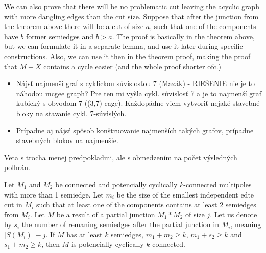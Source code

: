 \documentclass[12pt, twoside]{book}
\begin{document}
\todo{}We can also prove that there will be no problematic cut leaving the acyclic graph with more dangling edges than the cut size. Suppose that after the junction from the theorem above there will be a cut of size $a$, such that one of the components have $b$ former semiedges and $b>a$. The proof is basically in the theorem above, but we can formulate it in a separate lemma, and use it later during specific constructions. Also, we can use it then in the theorem proof, making the proof that $M-X$ contains a cycle easier (and the whole proof shorter ofc.)

\begin{itemize}
	\item Nájsť najmenší graf s cyklickou súvislosťou 7 (Mazák) - RIEŠENIE nie je to náhodou mcgee graph? Pre ten mi vyšla cykl. súvislosť 7 a je to najmenší graf kubický s obvodom 7 ((3,7)-cage). Každopádne viem vytvoriť nejaké stavebné bloky na stavanie cykl. 7-súvislých.
	\item Prípadne aj nájsť spôsob konštruovanie najmenších takých grafov, prípadne stavebných blokov na najmenšie.
\end{itemize}

Veta s trocha menej predpokladmi, ale s obmedzením na počet výsledných polhrán.
\begin{theorem}
	Let $M_1$ and $M_2$ be connected and potencially cyclically $k$-connected multipoles with more than 1 semiedge. Let $m_i$ be the size of the smallest independent edte cut in $M_i$ such that at least one of the components contains at least 2 semiedges from $M_i$. Let $M$ be a result of a partial junction $M_1*M_2$ of size $j$. Let us denote by $s_i$ the number of remaning semiedges after the partial junction in $M_i$, meaning $|S(M_i)|-j$. If $M$ has at least $k$ semiedges, $m_1+m_2\geq k$, $m_1+s_2\geq k$ and $s_1+m_2\geq k$, then $M$ is potencially cyclically $k$-connected.
\end{theorem}
\end{document}
